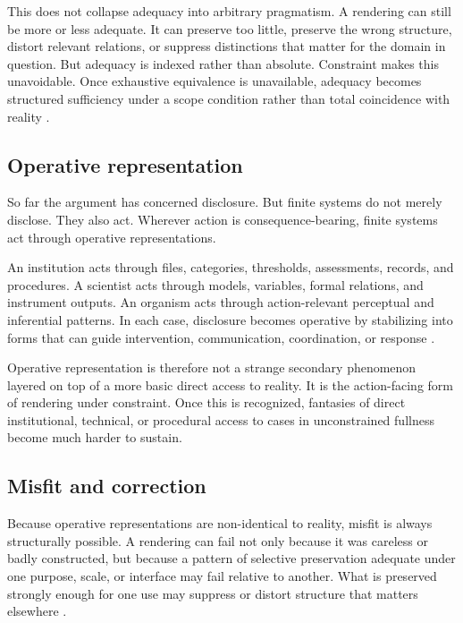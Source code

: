\documentclass[11pt]{article}
\begin{document}
This does not collapse adequacy into arbitrary pragmatism. A rendering can still be more or less adequate. It can preserve too little, preserve the wrong structure, distort relevant relations, or suppress distinctions that matter for the domain in question. But adequacy is indexed rather than absolute. Constraint makes this unavoidable. Once exhaustive equivalence is unavailable, adequacy becomes structured sufficiency under a scope condition rather than total coincidence with reality \cite{FriggHartmann2025ModelsScienceSEP,Giere2006ScientificPerspectivism,Massimi2022PerspectivalRealism,Chang2022RealismForRealisticPeople}.

\subsection{Operative representation}

So far the argument has concerned disclosure. But finite systems do not merely disclose. They also act. Wherever action is consequence-bearing, finite systems act through operative representations.

An institution acts through files, categories, thresholds, assessments, records, and procedures. A scientist acts through models, variables, formal relations, and instrument outputs. An organism acts through action-relevant perceptual and inferential patterns. In each case, disclosure becomes operative by stabilizing into forms that can guide intervention, communication, coordination, or response \cite{ConantAshby1970GoodRegulator,Ashby1956IntroductionCybernetics,BowkerStar1999SortingThingsOut,Gibson1979EcologicalApproachVisualPerception}.

Operative representation is therefore not a strange secondary phenomenon layered on top of a more basic direct access to reality. It is the action-facing form of rendering under constraint. Once this is recognized, fantasies of direct institutional, technical, or procedural access to cases in unconstrained fullness become much harder to sustain.

\subsection{Misfit and correction}

Because operative representations are non-identical to reality, misfit is always structurally possible. A rendering can fail not only because it was careless or badly constructed, but because a pattern of selective preservation adequate under one purpose, scale, or interface may fail relative to another. What is preserved strongly enough for one use may suppress or distort structure that matters elsewhere \cite{FriggNguyen2021ScientificRepresentationSEP,BowkerStar1999SortingThingsOut}.
\end{document}
